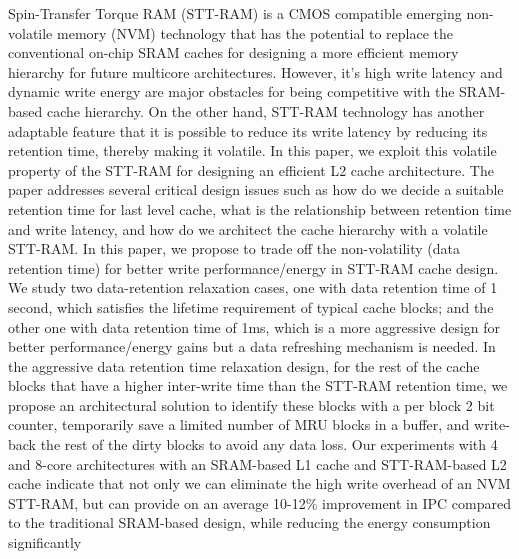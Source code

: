 
Spin-Transfer Torque RAM (STT-RAM) is a CMOS compatible emerging non-volatile memory (NVM)
technology that has the potential to replace the conventional
on-chip SRAM caches for designing a more efficient memory hierarchy for
future multicore architectures.
However, it's high write latency and dynamic
write energy are major obstacles for being competitive with the SRAM-based cache hierarchy.
On the other hand, STT-RAM technology has another adaptable feature that it is possible to reduce its write
latency by reducing its retention time, thereby making it volatile.
In this paper, we exploit this volatile property of the STT-RAM for designing an efficient L2 cache
architecture. The paper addresses several critical design issues such as how do we decide a suitable retention time for last level cache,
what is the relationship between retention time and write latency,
and how do we architect the cache hierarchy with a volatile STT-RAM.
In this paper, we propose to trade off the non-volatility (data retention time)
for better write performance/energy in STT-RAM cache design. We study two
data-retention relaxation cases, one with data retention time of 1 second, which satisfies the lifetime requirement of typical cache blocks; and the other one with data retention time of 1ms, which is a more aggressive design for better performance/energy gains but a data refreshing mechanism is needed.
In the aggressive data retention time relaxation design, for the rest of the cache blocks that have a higher inter-write
time than the STT-RAM retention time, we propose an architectural solution to identify these blocks
with a per block 2 bit counter, temporarily save a limited number of MRU blocks in a buffer,
and write-back the rest of the dirty blocks to avoid any data loss.
Our experiments with 4 and 8-core architectures with an SRAM-based L1 cache and STT-RAM-based L2 cache
indicate that not only we can eliminate the high write overhead of an NVM STT-RAM, but can provide
on an average 10-12\% improvement in IPC compared to the traditional SRAM-based
design, while reducing the energy consumption significantly

